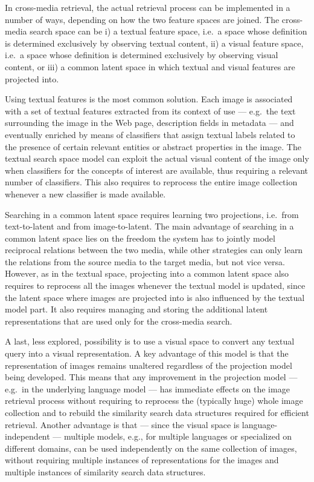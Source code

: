 In cross-media retrieval, the actual retrieval process can be implemented in a number of ways, depending on how the two feature spaces are joined.
The cross-media search space can be i) a textual feature space, i.e.\ a space whose definition is determined exclusively by observing textual content, ii)
a visual feature space, i.e.\ a space whose definition is determined exclusively by observing visual content,
or iii) a common latent space in which textual and visual features are projected into.

Using textual features is the most common solution. %
Each image is associated with a set of textual features extracted from its context of use --- e.g.\ the text surrounding the image in the Web page, description fields in metadata --- and eventually enriched by means of classifiers that assign textual labels related to the presence of certain relevant entities or abstract properties in the image.
The textual search space model can exploit the actual visual content of the image only when classifiers for the concepts of interest are available, thus requiring a relevant number of classifiers.
This also requires to reprocess the entire image collection whenever a new classifier is made available.

Searching in a common latent space requires learning two projections, i.e.\ from text-to-latent and from image-to-latent.
The main advantage of searching in a common latent space lies on the freedom the system has to jointly model reciprocal relations between the two media, while other strategies can only learn the relations from the source media to the target media, but not vice versa.
However, as in the textual space, projecting into a common latent space also requires to reprocess all the images whenever the textual model is updated, since the latent space where images are projected into is also influenced by the textual model part.
It also requires managing and storing the additional latent representations that are used only for the cross-media search.

A last, less explored, possibility is to use a visual space to convert any textual query into a visual representation.
A key advantage of this model is that the representation of images remains unaltered regardless of the projection model being developed.
This means that any improvement in the projection model --- e.g.\ in the underlying language model --- has immediate effects on the image retrieval process without requiring to reprocess the (typically huge) whole image collection and to rebuild the similarity search data structures required for efficient retrieval.
Another advantage is that --- since the visual space is language-independent --- multiple models, e.g., for multiple languages or specialized on different domains, can be used independently on the same collection of images, without requiring multiple instances of representations for the images and multiple instances of similarity search data structures.

